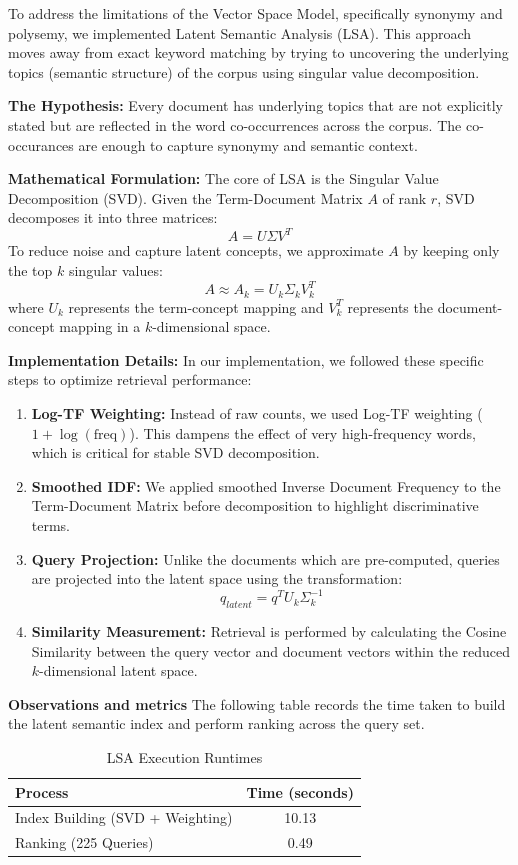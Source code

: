 \documentclass{article}
\begin{document}
To address the limitations of the Vector Space Model, specifically synonymy and polysemy, we implemented Latent Semantic Analysis (LSA). This approach moves away from exact keyword matching by trying to uncovering the underlying topics (semantic structure) of the corpus using singular value decomposition.

\textbf{The Hypothesis:} Every document has underlying topics that are not explicitly stated but are reflected in the word co-occurrences across the corpus. The co-occurances are enough to capture synonymy and semantic context.

\textbf{Mathematical Formulation:}
The core of LSA is the Singular Value Decomposition (SVD). Given the Term-Document Matrix $A$ of rank $r$, SVD decomposes it into three matrices:
\[ A = U \Sigma V^T \]
To reduce noise and capture latent concepts, we approximate $A$ by keeping only the top $k$ singular values:
\[ A \approx A_k = U_k \Sigma_k V_k^T \]
where $U_k$ represents the term-concept mapping and $V_k^T$ represents the document-concept mapping in a $k$-dimensional space.

\textbf{Implementation Details:}
In our implementation, we followed these specific steps to optimize retrieval performance:
\begin{enumerate}
    \item \textbf{Log-TF Weighting:} Instead of raw counts, we used Log-TF weighting ($1 + \log(\text{freq})$). This dampens the effect of very high-frequency words, which is critical for stable SVD decomposition.
    \item \textbf{Smoothed IDF:} We applied smoothed Inverse Document Frequency to the Term-Document Matrix before decomposition to highlight discriminative terms.
    \item \textbf{Query Projection:} Unlike the documents which are pre-computed, queries are projected into the latent space using the transformation:
    \[ q_{latent} = q^T U_k \Sigma_k^{-1} \]
    \item \textbf{Similarity Measurement:} Retrieval is performed by calculating the Cosine Similarity between the query vector and document vectors within the reduced $k$-dimensional latent space.
\end{enumerate}

\textbf{Observations and metrics}
The following table records the time taken to build the latent semantic index and perform ranking across the query set.

\begin{table}[H]
\centering
\begin{tabular}{|l|c|}
\hline
\textbf{Process} & \textbf{Time (seconds)} \\ \hline
Index Building (SVD + Weighting) & 10.13 \\ \hline
Ranking (225 Queries) & 0.49 \\ \hline
\end{tabular}
\caption{LSA Execution Runtimes}
\end{table}
\end{document}
